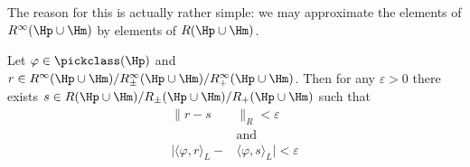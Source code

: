 The reason for this is actually rather simple: we may approximate the elements of $R^{\infty}(\Hp \cup \Hm)$ by elements of $R(\Hp \cup \Hm)$.

\begin{lem}\label{rat_multiple_approx}
	Let $\varphi \in \pickclass(\Hp)$ and $r \in R^{\infty}(\Hp \cup \Hm)/R^{\infty}_{\pm}(\Hp \cup \Hm)/R^{\infty}_{+}(\Hp \cup \Hm)$. Then for any $\varepsilon > 0$ there exists $s \in R(\Hp \cup \Hm)/R_{\pm}(\Hp \cup \Hm)/R_{+}(\Hp \cup \Hm)$ such that
	\begin{align}\label{rat_approx}
		\|r - s&\|_{R} < \varepsilon \nonumber\\
		&\text{and } \\
		|\langle \varphi, r\rangle_{L} -  &\langle \varphi, s\rangle_{L}| < \varepsilon \nonumber
	\end{align}
\end{lem}
